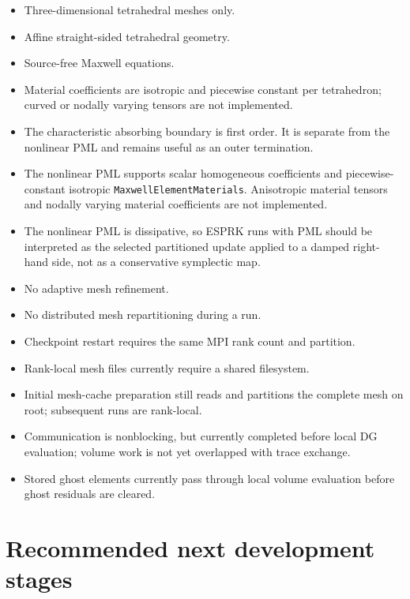 \documentclass[11pt,oneside]{book}
\newcommand{\code}[1]{\texttt{#1}}
\begin{document}
\begin{itemize}[leftmargin=*]
  \item Three-dimensional tetrahedral meshes only.
  \item Affine straight-sided tetrahedral geometry.
  \item Source-free Maxwell equations.
  \item Material coefficients are isotropic and piecewise constant per
        tetrahedron; curved or nodally varying tensors are not implemented.
  \item The characteristic absorbing boundary is first order. It is separate
        from the nonlinear PML and remains useful as an outer termination.
  \item The nonlinear PML supports scalar homogeneous coefficients and
        piecewise-constant isotropic \code{MaxwellElementMaterials}. Anisotropic
        material tensors and nodally varying material coefficients are not
        implemented.
  \item The nonlinear PML is dissipative, so ESPRK runs with PML should be
        interpreted as the selected partitioned update applied to a damped
        right-hand side, not as a conservative symplectic map.
  \item No adaptive mesh refinement.
  \item No distributed mesh repartitioning during a run.
  \item Checkpoint restart requires the same MPI rank count and partition.
  \item Rank-local mesh files currently require a shared filesystem.
  \item Initial mesh-cache preparation still reads and partitions the complete
        mesh on root; subsequent runs are rank-local.
  \item Communication is nonblocking, but currently completed before local DG
        evaluation; volume work is not yet overlapped with trace exchange.
  \item Stored ghost elements currently pass through local volume evaluation
        before ghost residuals are cleared.
\end{itemize}

\section{Recommended next development stages}
\end{document}
